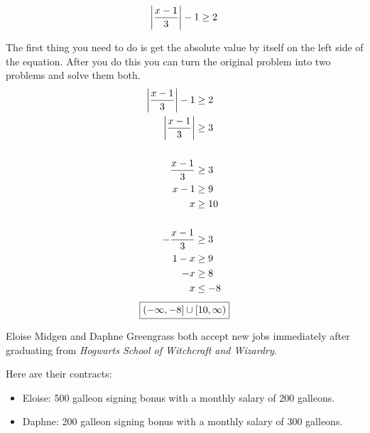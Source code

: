 \documentclass[letterpaper, landscape]{exam}
\begin{document}
\begin{questions}
      \question[10]
        \[ 
          \abs{ \frac{x - 1}{3} } - 1 \geq 2 
        \]
        \begin{solution}
          The first thing you need to do is get the absolute value by itself on the left side of
          the equation. After you do this you can turn the original problem into two problems and
          solve them both.
          \begin{align*}
            \abs{ \frac{x - 1}{3} } - 1 & \geq 2 \\
            \abs{ \frac{x - 1}{3} }     & \geq 3 \\
            \\
            \frac{x - 1}{3} & \geq 3 \\
            x - 1           & \geq 9 \\
            x               & \geq 10 \\
            \\
            - \frac{x - 1}{3} & \geq 3 \\
            1 - x             & \geq 9 \\
            - x               & \geq 8 \\
            x                 & \leq -8 \\
          \end{align*}
          \[
            \boxed{ \intoc{ -\infty, -8 } \cup \intco{ 10, \infty } }
          \]

        \end{solution}



    \ifprintanswers{}
      \newpage
    \fi

    \question{}
    Eloise Midgen and Daphne Greengrass both accept new jobs immediately after graduating from
    {\em Hogwarts School of Witchcraft and Wizardry}. 
    
    Here are their contracts:

    \begin{itemize}
      \item Eloise: 500 galleon signing bonus with a monthly salary of 200 galleons. 
      \item Daphne: 200 galleon signing bonus with a monthly salary of 300 galleons. 
    \end{itemize}


\end{questions}
\end{document}
